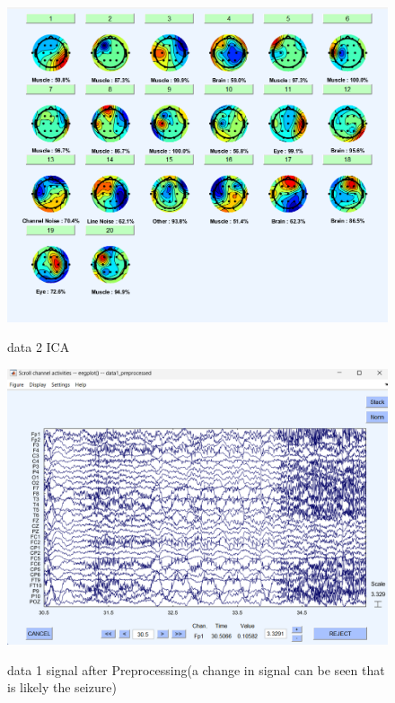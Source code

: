 \documentclass[11pt]{article}
\begin{document}
\begin{figure}[H]
    \begin{center}
        \includegraphics[scale=0.55]{Fig/ICA_sources_data2.png}
        \label{fig:ICAsources2}
        \caption{data 2 ICA}
    \end{center}
\end{figure}


\begin{figure}[H]
    \begin{center}
        \includegraphics[scale=0.55]{Fig/channel_activity_data1.png}
        \label{fig:data1Activity}
        \caption{data 1 signal after Preprocessing(a change in signal can be seen that is likely the seizure)}
    \end{center}
\end{figure}
\end{document}
